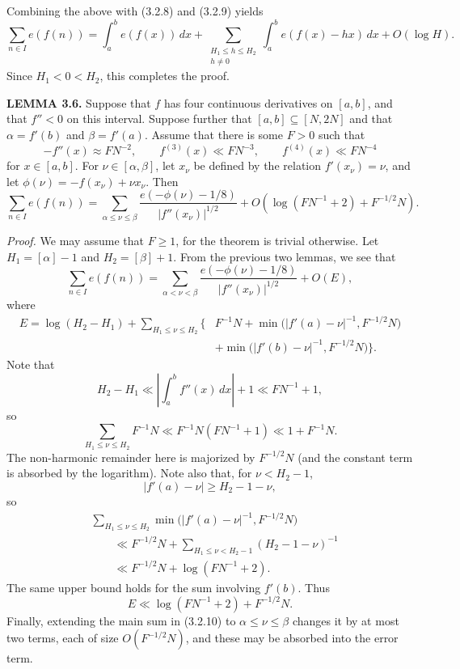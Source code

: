 \documentclass[10pt]{article}
\begin{document}
Combining the above with (3.2.8) and (3.2.9) yields
\[
 \sum_{n\in I}e(f(n))
 =\int_a^b e(f(x))\,dx
 +\sum_{\substack{H_1\leq h\leq H_2\\h\neq0}}
  \int_a^b e(f(x)-hx)\,dx+O(\log H).
\]
Since $H_1<0<H_2$, this completes the proof.

\medskip
\noindent\textbf{LEMMA 3.6.}
Suppose that $f$ has four continuous derivatives on $[a,b]$, and that
$f''<0$ on this interval. Suppose further that $[a,b]\subseteq[N,2N]$ and
that $\alpha=f'(b)$ and $\beta=f'(a)$. Assume that there is some $F>0$ such
that
\[
 -f''(x)\approx FN^{-2},
 \qquad f^{(3)}(x)\ll FN^{-3},
 \qquad f^{(4)}(x)\ll FN^{-4}
\]
for $x\in[a,b]$. For $\nu\in[\alpha,\beta]$, let $x_\nu$ be defined by the
relation $f'(x_\nu)=\nu$, and let
$\phi(\nu)=-f(x_\nu)+\nu x_\nu$. Then
\[
 \sum_{n\in I}e(f(n))
 =\sum_{\alpha\leq\nu\leq\beta}
  \frac{e(-\phi(\nu)-1/8)}{|f''(x_\nu)|^{1/2}}
 +O\left(\log(FN^{-1}+2)+F^{-1/2}N\right).
\]

\noindent\textit{Proof.}
We may assume that $F\geq1$, for the theorem is trivial otherwise. Let
$H_1=[\alpha]-1$ and $H_2=[\beta]+1$. From the previous two lemmas, we see
that
\begin{equation*}
 \sum_{n\in I}e(f(n))
 =\sum_{\alpha<\nu<\beta}
  \frac{e(-\phi(\nu)-1/8)}{|f''(x_\nu)|^{1/2}}+O(E), \tag{3.2.10}
\end{equation*}
where
\[
\begin{aligned}
 E=\log(H_2-H_1)+\sum_{H_1\leq\nu\leq H_2}\bigl\{&F^{-1}N
 +\min\bigl(|f'(a)-\nu|^{-1},F^{-1/2}N\bigr)\\
 &+\min\bigl(|f'(b)-\nu|^{-1},F^{-1/2}N\bigr)\bigr\}.
\end{aligned}
\]
Note that
\[
 H_2-H_1\ll\left|\int_a^b f''(x)\,dx\right|+1\ll FN^{-1}+1,
\]
so
\[
 \sum_{H_1\leq\nu\leq H_2}F^{-1}N
 \ll F^{-1}N(FN^{-1}+1)\ll1+F^{-1}N.
\]
The non-harmonic remainder here is majorized by $F^{-1/2}N$ (and the
constant term is absorbed by the logarithm). Note also that, for
$\nu<H_2-1$,
\[
 |f'(a)-\nu|\geq H_2-1-\nu,
\]
so
\[
\begin{aligned}
 &\sum_{H_1\leq\nu\leq H_2}
 \min\bigl(|f'(a)-\nu|^{-1},F^{-1/2}N\bigr) \\
 &\qquad\ll F^{-1/2}N
 +\sum_{H_1\leq\nu<H_2-1}(H_2-1-\nu)^{-1} \\
 &\qquad\ll F^{-1/2}N+\log(FN^{-1}+2).
\end{aligned}
\]
The same upper bound holds for the sum involving $f'(b)$. Thus
\[
 E\ll\log(FN^{-1}+2)+F^{-1/2}N.
\]
Finally, extending the main sum in (3.2.10) to
$\alpha\leq\nu\leq\beta$ changes it by at most two terms, each of size
$O(F^{-1/2}N)$, and these may be absorbed into the error term.
\end{document}
